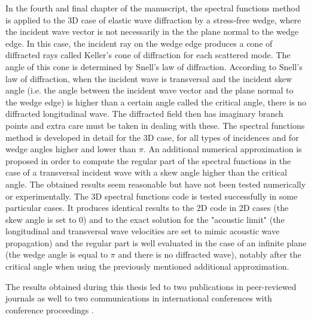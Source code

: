 In the fourth and final chapter of the manuscript, the spectral functions method is applied to the 3D case of elastic wave diffraction by a stress-free wedge, where the incident wave vector is not necessarily in the the plane normal to the wedge edge. In this case, the incident ray on the wedge edge produces a cone of diffracted rays called Keller's cone of diffraction for each scattered mode. The angle of this cone is determined by Snell's law of diffraction. According to Snell's law of diffraction, when the incident wave is transversal and the incident skew angle (i.e. the angle between the incident wave vector and the plane normal to the wedge edge) is higher than a certain angle called the critical angle, there is no diffracted longitudinal wave. The diffracted field then has imaginary branch points and extra care must be taken in dealing with these. The spectral functions method is developed in detail for the 3D case, for all types of incidences and for wedge angles higher and lower than $\pi$. An additional numerical approximation is proposed in order to compute the regular part of the spectral functions in the case of a transversal incident wave with a skew angle higher than the critical angle. The obtained results seem reasonable but have not been tested numerically or experimentally. The 3D spectral functions code is tested successfully in some particular cases. It produces identical results to the 2D code in 2D cases (the skew angle is set to $0$) and to the exact solution for the "acoustic limit" (the longitudinal and transversal wave velocities are set to mimic acoustic wave propagation) and the regular part is well evaluated in the case of an infinite plane (the wedge angle is equal to $\pi$ and there is no diffracted wave), notably after the critical angle when using the previously mentioned additional approximation.

The results obtained during this thesis led to two publications in peer-reviewed journals \cite{article, articleelasto, articleITD} as well to two communications in international conferences with conference proceedings \cite{DD2018,AFPAC}.

